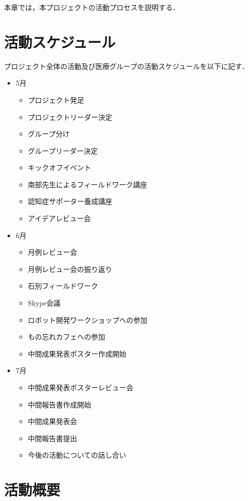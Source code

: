 \documentclass[../report]{subfiles}
\begin{document}
本章では，本プロジェクトの活動プロセスを説明する．

\section{活動スケジュール}
プロジェクト全体の活動及び医療グループの活動スケジュールを以下に記す．
\begin{itemize}
    \item[] 5月
    \begin{itemize}
        \item プロジェクト発足
        \item プロジェクトリーダー決定
        \item グループ分け
        \item グループリーダー決定
        \item キックオフイベント
        \item 南部先生によるフィールドワーク講座
        \item 認知症サポーター養成講座
        \item アイデアレビュー会
    \end{itemize}
    \item[] 6月
    \begin{itemize}
        \item 月例レビュー会
        \item 月例レビュー会の振り返り
        \item 石別フィールドワーク
        \item Skype会議
        \item ロボット開発ワークショップへの参加
        \item もの忘れカフェへの参加
        \item 中間成果発表ポスター作成開始
    \end{itemize}
    \item[] 7月
    \begin{itemize}
        \item 中間成果発表ポスターレビュー会
        \item 中間報告書作成開始
        \item 中間成果発表会
        \item 中間報告書提出
        \item 今後の活動についての話し合い
    \end{itemize}
\end{itemize}

\section{活動概要}
\end{document}

